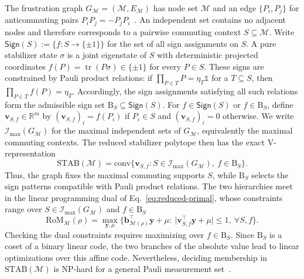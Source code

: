 \documentclass[10pt,aps,pra,twocolumn,floatfix,nofootinbib,superscriptaddress,longbibliography]{revtex4-2}
\newcommand{\R}{\mathbb R}
\newcommand{\Mcal}{\mathcal M}
\newcommand{\STAB}{\mathrm{STAB}}
\newcommand{\RoM}{\mathrm{RoM}}
\newcommand{\conv}{\mathrm{conv}}
\renewcommand{\tr}{\operatorname{tr}}
\newcommand{\Ind}{\mathcal I}
\newcommand{\Bset}{\mathrm B}
\providecommand{\mathbm}[1]{\bm{#1}}
\begin{document}
	
	The frustration graph $G_\Mcal=(\Mcal,E_\Mcal)$ has node set $\Mcal$ and an edge $\{P_i,P_j\}$ for anticommuting pairs $P_iP_j=-P_jP_i$~\cite{chapman2020characterization,xu2024bounding}.
	An independent set contains no adjacent nodes and therefore corresponds to a pairwise commuting context $S\subseteq\Mcal$.
	Write $\mathsf{Sign}(S):=\{f:S\to\{\pm1\}\}$ for the set of all sign assignments on $S$.
	A pure stabilizer state $\sigma$ is a joint eigenstate of $S$ with deterministic projected coordinates $f(P)=\tr(P\sigma)\in\{\pm1\}$ for every $P\in S$.
	These signs are constrained by Pauli product relations: if $\prod_{P\in T}P=\eta_T\mathbb{1}$ for a $T\subseteq S$, then $\prod_{P\in T}f(P)=\eta_T$.
	Accordingly, the sign assignments satisfying all such relations form the admissible sign set $\Bset_S\subseteq\mathsf{Sign}(S)$.
	For $f\in\mathsf{Sign}(S)$ or $f\in\Bset_S$, define $\mathbm{v}_{S,f}\in\R^m$ by $(\mathbm{v}_{S,f})_i=f(P_i)$ if $P_i\in S$ and $(\mathbm{v}_{S,f})_i=0$ otherwise.
	We write $\Ind_{\max}(G_\Mcal)$ for the maximal independent sets of $G_\Mcal$, equivalently the maximal commuting contexts.
	The reduced stabilizer polytope then has the exact V-representation~\cite{varela2026predictingmagicmeasurements}
	{\small
		\begin{equation}
			\STAB(\Mcal)=\conv\{\mathbm{v}_{S,f}:S\in\Ind_{\max}(G_\Mcal),\ f\in\Bset_S\}.
			\label{eq:exact-vrep-new}
		\end{equation}
	}
	Thus, the graph fixes the maximal commuting supports $S$, while $\Bset_S$ selects the sign patterns compatible with Pauli product relations.
	The two hierarchies meet in the linear programming dual of Eq.~\eqref{eq:reduced-primal}, whose constraints range over $S\in\Ind_{\max}(G_\Mcal)$ and $f\in\Bset_S$~\cite{hamaguchi2024handbook}
	{\small
		\begin{equation}
			\RoM_\Mcal(\rho)=\max_{\mathbm{y},\mu}\Big\{\mathbm{b}_{\Mcal(\rho)}^\top\mathbm{y}+\mu:\ \big|\mathbm{v}_{S,f}^\top\mathbm{y}+\mu\big|\le1,\ \forall S,f\Big\}.
			\label{eq:dual-exact}
		\end{equation}
	}
	Checking the dual constraints requires maximizing over $f\in\Bset_S$. Since $\Bset_S$ is a coset of a binary linear code, the two branches of the absolute value lead to linear optimizations over this affine code. Nevertheless, deciding membership in $\STAB(\Mcal)$ is NP-hard for a general Pauli measurement set~\cite{varela2026predictingmagicmeasurements}.
	
	
	
\end{document}
